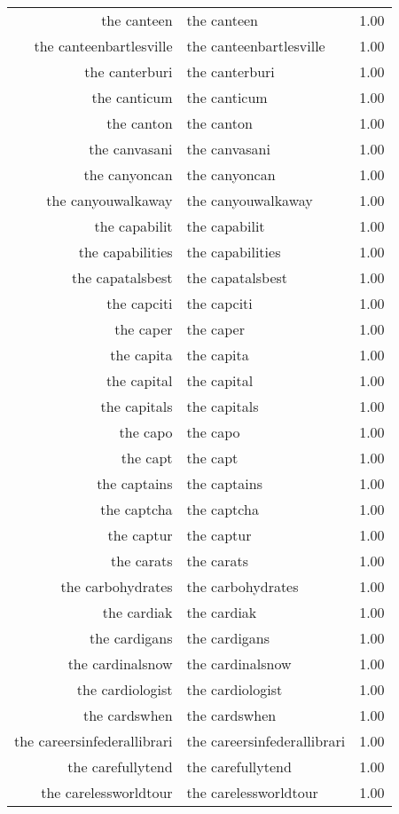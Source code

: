 \begin{table}[ht]
\begin{tabular}{rlr}
  the canteen & the canteen & 1.00 \\ 
  the canteenbartlesville & the canteenbartlesville & 1.00 \\ 
  the canterburi & the canterburi & 1.00 \\ 
  the canticum & the canticum & 1.00 \\ 
  the canton & the canton & 1.00 \\ 
  the canvasani & the canvasani & 1.00 \\ 
  the canyoncan & the canyoncan & 1.00 \\ 
  the canyouwalkaway & the canyouwalkaway & 1.00 \\ 
  the capabilit & the capabilit & 1.00 \\ 
  the capabilities & the capabilities & 1.00 \\ 
  the capatalsbest & the capatalsbest & 1.00 \\ 
  the capciti & the capciti & 1.00 \\ 
  the caper & the caper & 1.00 \\ 
  the capita & the capita & 1.00 \\ 
  the capital & the capital & 1.00 \\ 
  the capitals & the capitals & 1.00 \\ 
  the capo & the capo & 1.00 \\ 
  the capt & the capt & 1.00 \\ 
  the captains & the captains & 1.00 \\ 
  the captcha & the captcha & 1.00 \\ 
  the captur & the captur & 1.00 \\ 
  the carats & the carats & 1.00 \\ 
  the carbohydrates & the carbohydrates & 1.00 \\ 
  the cardiak & the cardiak & 1.00 \\ 
  the cardigans & the cardigans & 1.00 \\ 
  the cardinalsnow & the cardinalsnow & 1.00 \\ 
  the cardiologist & the cardiologist & 1.00 \\ 
  the cardswhen & the cardswhen & 1.00 \\ 
  the careersinfederallibrari & the careersinfederallibrari & 1.00 \\ 
  the carefullytend & the carefullytend & 1.00 \\ 
  the carelessworldtour & the carelessworldtour & 1.00 \\ 

\end{tabular}
\end{table}
